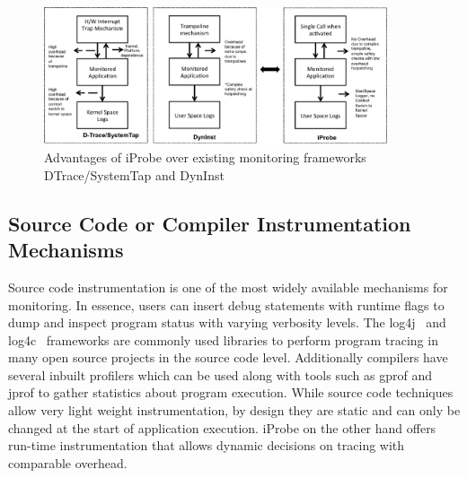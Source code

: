 
\begin{figure}[ht]
	\begin{center}
		\includegraphics[width=0.9\textwidth]{iprobe/Images/related.eps}
		\caption{Advantages of iProbe over existing monitoring frameworks DTrace/SystemTap and DynInst}
		\label{fig:related}
	\end{center}
\end{figure}

\subsection{Source Code or Compiler Instrumentation Mechanisms}
Source code instrumentation is one of the most widely available mechanisms for monitoring. 
In essence, users can insert debug statements with runtime flags to dump and inspect program status with varying verbosity levels. 
The log4j~\cite{log4j} and log4c~\cite{log4c} frameworks are commonly used libraries to perform program tracing in many open source projects in the source code level. 
Additionally compilers have several inbuilt profilers which can be used along with tools such as gprof and jprof to gather statistics about program execution.
While source code techniques allow very light weight instrumentation, by design they are static and can only be changed at the start of application execution. 
iProbe on the other hand offers run-time instrumentation that allows dynamic decisions on tracing with comparable overhead.


